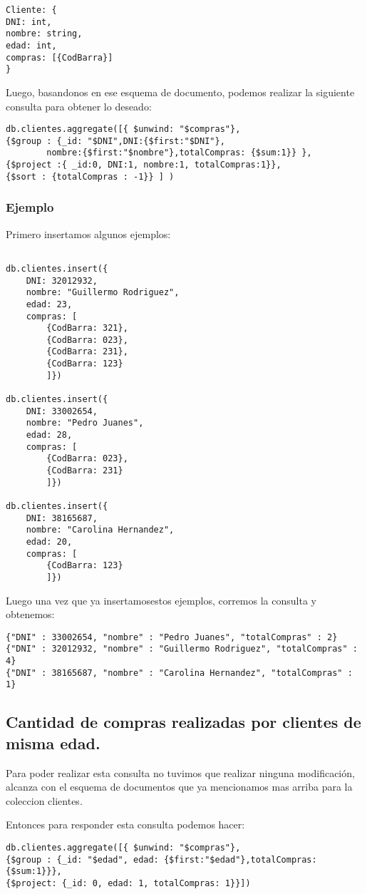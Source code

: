 \begin{lstlisting}
Cliente: {
DNI: int,
nombre: string,
edad: int,
compras: [{CodBarra}]
}
\end{lstlisting}


Luego, basandonos en ese esquema de documento, podemos realizar la siguiente consulta para obtener lo deseado:
\begin{lstlisting}
db.clientes.aggregate([{ $unwind: "$compras"},
{$group : {_id: "$DNI",DNI:{$first:"$DNI"},
		nombre:{$first:"$nombre"},totalCompras: {$sum:1}} },
{$project :{ _id:0, DNI:1, nombre:1, totalCompras:1}},
{$sort : {totalCompras : -1}} ] )
\end{lstlisting}

\subsubsection{Ejemplo}
Primero insertamos algunos ejemplos:
\begin{lstlisting}

db.clientes.insert({
	DNI: 32012932,
	nombre: "Guillermo Rodriguez",
	edad: 23,
	compras: [
		{CodBarra: 321},
		{CodBarra: 023},
		{CodBarra: 231},
		{CodBarra: 123}
		]})

db.clientes.insert({
	DNI: 33002654,
	nombre: "Pedro Juanes",
	edad: 28,
	compras: [
		{CodBarra: 023},
		{CodBarra: 231}
		]})

db.clientes.insert({
	DNI: 38165687,
	nombre: "Carolina Hernandez",
	edad: 20,
	compras: [
		{CodBarra: 123}
		]})
\end{lstlisting}

Luego una vez que ya insertamosestos ejemplos, corremos la consulta y obtenemos:
\begin{lstlisting}
{"DNI" : 33002654, "nombre" : "Pedro Juanes", "totalCompras" : 2}
{"DNI" : 32012932, "nombre" : "Guillermo Rodriguez", "totalCompras" : 4}
{"DNI" : 38165687, "nombre" : "Carolina Hernandez", "totalCompras" : 1}
\end{lstlisting}

\subsection{Cantidad de compras realizadas por clientes de misma edad.}
Para poder realizar esta consulta no tuvimos que realizar ninguna modificación, alcanza con el esquema
de documentos que ya mencionamos mas arriba para la coleccion clientes.

Entonces para responder esta consulta podemos hacer:
\begin{lstlisting}
db.clientes.aggregate([{ $unwind: "$compras"},
{$group : {_id: "$edad", edad: {$first:"$edad"},totalCompras:{$sum:1}}},
{$project: {_id: 0, edad: 1, totalCompras: 1}}])
\end{lstlisting}

